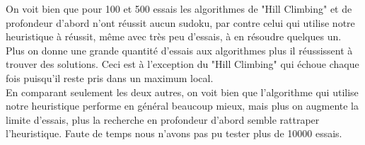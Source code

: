 \documentclass[a4paper,10pt]{article}
\begin{document}
On voit bien que pour 100 et 500 essais les algorithmes de "Hill Climbing" et de profondeur d'abord n'ont réussit aucun sudoku, par contre celui qui utilise notre heuristique à réussit, même avec très peu d'essais, à en résoudre quelques un. Plus on donne une grande quantité d'essais aux algorithmes plus il réussissent à trouver des solutions. Ceci est à l'exception du "Hill Climbing" qui échoue chaque fois puisqu'il reste pris dans un maximum local.\\

En comparant seulement les deux autres, on voit bien que l'algorithme qui utilise notre heuristique performe en général beaucoup mieux, mais plus on augmente la limite d'essais, plus la recherche en profondeur d'abord semble rattraper l'heuristique. Faute de temps nous n'avons pas pu tester plus de 10000 essais. 




\end{document}
